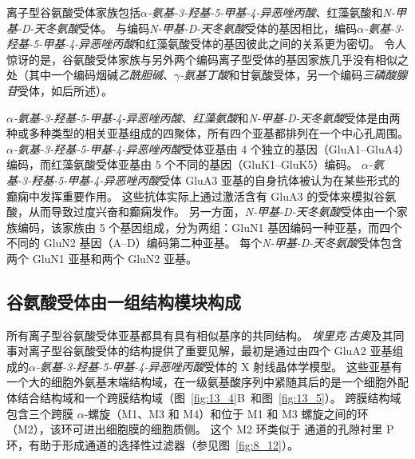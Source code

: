 离子型谷氨酸受体家族包括\textit{$\alpha$-氨基-3-羟基-5-甲基-4-异恶唑丙酸}、红藻氨酸和\textit{N-甲基-D-天冬氨酸}受体。
与编码\textit{N-甲基-D-天冬氨酸}受体的基因相比，编码\textit{$\alpha$-氨基-3-羟基-5-甲基-4-异恶唑丙酸}和红藻氨酸受体的基因彼此之间的关系更为密切。
令人惊讶的是，谷氨酸受体家族与另外两个编码离子型受体的基因家族几乎没有相似之处（其中一个编码烟碱\textit{乙酰胆碱}、\textit{$\gamma$-氨基丁酸}和甘氨酸受体，另一个编码\textit{三磷酸腺苷}受体，如后所述）。


\textit{$\alpha$-氨基-3-羟基-5-甲基-4-异恶唑丙酸}、\textit{红藻氨酸}和\textit{N-甲基-D-天冬氨酸}受体是由两种或多种类型的相关亚基组成的四聚体，所有四个亚基都排列在一个中心孔周围。
\textit{$\alpha$-氨基-3-羟基-5-甲基-4-异恶唑丙酸}受体亚基由 4 个独立的基因（GluA1–GluA4）编码，而红藻氨酸受体亚基由 5 个不同的基因（GluK1–GluK5）编码。
\textit{$\alpha$-氨基-3-羟基-5-甲基-4-异恶唑丙酸}受体 GluA3 亚基的自身抗体被认为在某些形式的癫痫中发挥重要作用。
这些抗体实际上通过激活含有 GluA3 的受体来模拟谷氨酸，从而导致过度兴奋和癫痫发作。
另一方面，\textit{N-甲基-D-天冬氨酸}受体由一个家族编码，该家族由 5 个基因组成，分为两组：GluN1 基因编码一种亚基，而四个不同的 GluN2 基因（A–D）编码第二种亚基。
每个\textit{N-甲基-D-天冬氨酸}受体包含两个 GluN1 亚基和两个 GluN2 亚基。



\subsection{谷氨酸受体由一组结构模块构成}

所有离子型谷氨酸受体亚基都具有具有相似基序的共同结构。
\textit{埃里克$\cdot$古奥}及其同事对离子型谷氨酸受体的结构提供了重要见解，最初是通过由四个 GluA2 亚基组成的\textit{$\alpha$-氨基-3-羟基-5-甲基-4-异恶唑丙酸}受体的 X 射线晶体学模型。
这些亚基有一个大的细胞外氨基末端结构域，在一级氨基酸序列中紧随其后的是一个细胞外配体结合结构域和一个跨膜结构域（图~\ref{fig:13_4}B~和图~\ref{fig:13_5}）。
跨膜结构域包含三个跨膜 $\alpha$-螺旋（M1、M3 和 M4）和位于 M1 和 M3 螺旋之间的环（M2），该环可进出细胞膜的细胞质侧。
这个 M2 环类似于  通道的孔隙衬里 P 环，有助于形成通道的选择性过滤器（参见图~\ref{fig:8_12}）。


